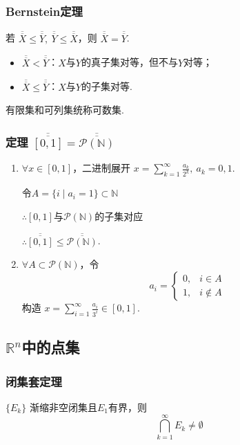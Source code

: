 \documentclass{article}
\begin{document}
	\subsubsection{Bernstein定理}
	若 $\overline{\overline{X}}\le\overline{\overline{Y}},\ \overline{\overline{Y}}\le\overline{\overline{X}}$，则 $\overline{\overline{X}}=\overline{\overline{Y}}$.
	\begin{itemize}
		\item $\overline{\overline{X}}<\overline{\overline{Y}}$：$X$与$Y$的真子集对等，但不与$Y$对等；
		\item $\overline{\overline{X}}\le\overline{\overline{Y}}$：$X$与$Y$的子集对等.
	\end{itemize}
	
	有限集和可列集统称可数集.
	
	\subsubsection{定理 $\overline{\overline{[0,1]}}=\overline{\overline{\mathscr{P}(\mathbb{N})}}$}
	\begin{enumerate}
		\item[$\Rightarrow$] $\forall x\in[0,1]$，二进制展开 $x=\sum\limits_{k=1}^{\infty}\frac{a_k}{2^k},\ a_k=0,1$.
		
		令$A=\{i\mid a_i=1\}\subset\mathbb{N}$
		
		$\therefore [0,1]$与$\mathscr{P}(\mathbb{N})$的子集对应
		
		$\therefore \overline{\overline{[0,1]}}\le\overline{\overline{\mathscr{P}(\mathbb{N})}}$.
		\item[$\Leftarrow$] $\forall A\subset\mathscr{P}(\mathbb{N})$，令
		\[
		a_i=
		\begin{cases}
			0,& i\in A\\
			1,& i\notin A
		\end{cases}
		\]
		构造 $x=\sum\limits_{i=1}^{\infty}\frac{a_i}{3^i}\in[0,1]$.
	\end{enumerate}
	
	\subsection{$\mathbb{R}^n$中的点集}
	\subsubsection{闭集套定理}
	$\{E_k\}$ 渐缩非空闭集且$E_1$有界，则
	\[
	\bigcap_{k=1}^{\infty}E_k \neq \emptyset
	\]
	
\end{document}
